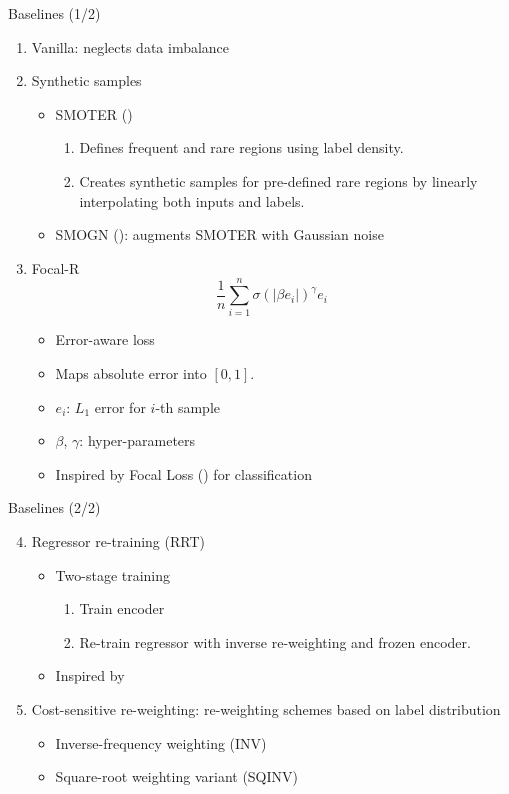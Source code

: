 \begin{frame}{Baselines (1/2)}
	\begin{enumerate}\setlength\itemsep{1.5em}
		\item<1-> Vanilla: neglects data imbalance
		\item<2-> Synthetic samples
		\begin{itemize}
			\item SMOTER (\cite{torgo2013smote})
			\begin{enumerate}
				\item Defines frequent and rare regions using label density.
				\item Creates synthetic samples for pre-defined rare regions by linearly interpolating both inputs and labels.
			\end{enumerate}
			\item SMOGN (\cite{branco2017smogn}): augments SMOTER with Gaussian noise
		\end{itemize}
		\item<3-> Focal-R
		\begin{equation*}
			\frac{1}{n} \sum_{i=1}^n \sigma(|\beta e_i|)^\gamma e_i
		\end{equation*}
		\begin{itemize}
			\item Error-aware loss
			\item Maps absolute error into $[0, 1]$.
			\item $e_i$: $L_1$ error for $i$-th sample
			\item $\beta$, $\gamma$: hyper-parameters
			\item Inspired by Focal Loss (\cite{lin2017focal}) for classification
		\end{itemize}
	\end{enumerate}
\end{frame}

\begin{frame}{Baselines (2/2)}
	\begin{enumerate}\setcounter{enumi}{3}\setlength\itemsep{1.5em}
		\item<1-> Regressor re-training (RRT)
		\begin{itemize}
			\item Two-stage training
			\begin{enumerate}
				\item Train encoder
				\item Re-train regressor with inverse re-weighting and frozen encoder.
			\end{enumerate}
			\item Inspired by \cite{kang2019decoupling}
		\end{itemize}
		\item<2-> Cost-sensitive re-weighting: re-weighting schemes based on label distribution
		\begin{itemize}
			\item Inverse-frequency weighting (INV)
			\item Square-root weighting variant (SQINV)
		\end{itemize}
	\end{enumerate}
\end{frame}